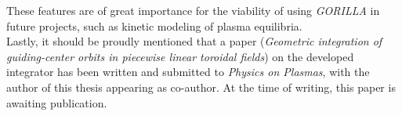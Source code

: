\documentclass[./main.tex]{subfiles}
\begin{document}
These features are of great importance for the viability of using \textit{GORILLA} in future projects, such as kinetic modeling of plasma equilibria.\\
Lastly, it should be proudly mentioned that a paper (\textit{Geometric integration of guiding-center orbits in piecewise linear toroidal fields}) on the developed integrator has been written and submitted to \textit{Physics on Plasmas}, with the author of this thesis appearing as co-author. At the time of writing, this paper is awaiting publication.

\newpage
\end{document}
